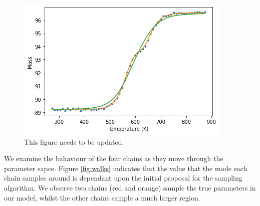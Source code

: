 \begin{figure}[h!]
\includegraphics[scale=1]{figures/bayesian/2_reactions/TGA_comparison.png}
\caption{This figure needs to be updated.}
\label{fig:modal_sim}
\end{figure}
%

We examine the bahaviour of the four chains as they move through the parameter sapce. Figure \ref{fig:walks} indicates that the value that the mode each chain samples around is dependant upon the initial proposal for the sampling algorithm. We observe two chains (red and orange) sample the true parameters in our model, whilst the other chains sample a much larger region. \\

